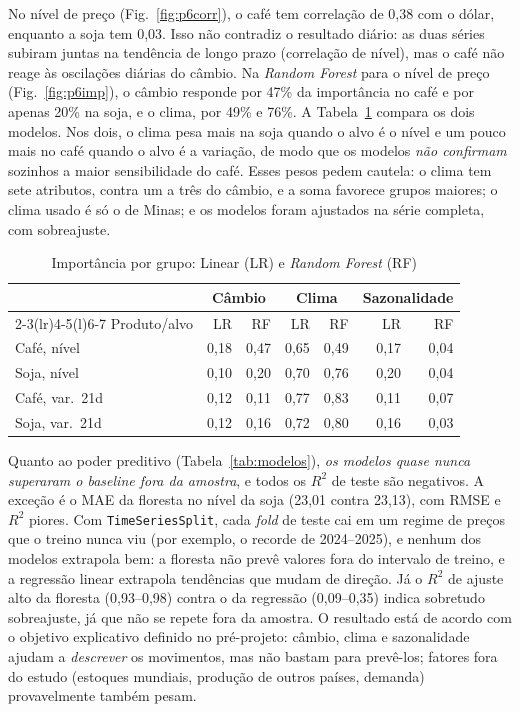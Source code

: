 \documentclass[conference]{IEEEtran}
\begin{document}
No nível de preço (Fig.~\ref{fig:p6corr}), o café tem correlação de 0,38 com o dólar, enquanto a soja
tem 0,03. Isso não contradiz o resultado diário: as duas séries subiram juntas na tendência de longo prazo
(correlação de nível), mas o café não reage às oscilações diárias do câmbio. Na \emph{Random Forest} para o
nível de preço (Fig.~\ref{fig:p6imp}), o câmbio responde por 47\% da importância no café e por apenas 20\% na soja, e o
clima, por 49\% e 76\%. A Tabela~\ref{tab:importancia} compara os dois modelos. Nos dois, o clima pesa mais na
soja quando o alvo é o nível e um pouco mais no café quando o alvo é a variação, de modo que os modelos
\emph{não confirmam} sozinhos a maior sensibilidade do café. Esses pesos pedem cautela: o clima tem sete
atributos, contra um a três do câmbio, e a soma favorece grupos maiores; o clima usado é só o de Minas; e os
modelos foram ajustados na série completa, com sobreajuste.

\begin{table}[!tb]
\centering
\caption{Importância por grupo: Linear (LR) e \emph{Random Forest} (RF)}
\label{tab:importancia}
\footnotesize
\setlength{\tabcolsep}{3.5pt}
\begin{tabular}{@{}lrrrrrr@{}}
\toprule
 & \multicolumn{2}{c}{Câmbio} & \multicolumn{2}{c}{Clima} & \multicolumn{2}{c}{Sazonalidade} \\
\cmidrule(lr){2-3}\cmidrule(lr){4-5}\cmidrule(l){6-7}
Produto/alvo & LR & RF & LR & RF & LR & RF \\
\midrule
Café, nível & 0,18 & 0,47 & 0,65 & 0,49 & 0,17 & 0,04 \\
Soja, nível & 0,10 & 0,20 & 0,70 & 0,76 & 0,20 & 0,04 \\
Café, var.~21d & 0,12 & 0,11 & 0,77 & 0,83 & 0,11 & 0,07 \\
Soja, var.~21d & 0,12 & 0,16 & 0,72 & 0,80 & 0,16 & 0,03 \\
\bottomrule
\end{tabular}
\end{table}

Quanto ao poder preditivo (Tabela~\ref{tab:modelos}), \emph{os modelos quase nunca superaram o baseline fora da amostra}, e todos os $R^2$ de teste são negativos. A exceção é o MAE da floresta no nível da soja (23,01 contra 23,13), com RMSE e $R^2$ piores. Com \texttt{TimeSeriesSplit}, cada \emph{fold} de teste
cai em um regime de preços que o treino nunca viu (por exemplo, o recorde de 2024--2025), e nenhum dos
modelos extrapola bem: a floresta não prevê valores fora do intervalo de treino, e a regressão
linear extrapola tendências que mudam de direção. Já o $R^2$ de ajuste alto da floresta (0,93--0,98)
contra o da regressão (0,09--0,35) indica sobretudo sobreajuste, já que não se repete fora da amostra. O
resultado está de acordo com o objetivo explicativo definido no pré-projeto: câmbio, clima e
sazonalidade ajudam a \emph{descrever} os movimentos, mas não bastam para prevê-los; fatores fora do estudo (estoques mundiais, produção de outros países, demanda) provavelmente também pesam.
\end{document}
